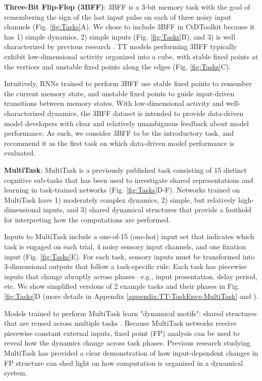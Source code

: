 \documentclass{article}
\begin{document}
\textbf{Three-Bit Flip-Flop (3BFF)}: 3BFF is a 3-bit memory task with the goal of remembering the sign of the last input pulse on each of three noisy input channels (Fig. \ref{fig:Tasks}A). We chose to include 3BFF in CtDToolkit because it has 1) simple dynamics, 2) simple inputs (Fig. \ref{fig:Tasks}B), and 3) is well characterized by previous research \cite{sussillo_opening_2013}. TT models performing 3BFF typically exhibit low-dimensional activity organized into a cube, with stable fixed points at the vertices and unstable fixed points along the edges (Fig. \ref{fig:Tasks}C).

Intuitively, RNNs trained to perform 3BFF use stable fixed points to remember the current memory state, and unstable fixed points to guide input-driven transitions between memory states. With low-dimensional activity and well-characterized dynamics, the 3BFF dataset is intended to provide data-driven model developers with clear and relatively unambiguous feedback about model performance. As such, we consider 3BFF to be the introductory task, and recommend it as the first task on which data-driven model performance is evaluated.

\textbf{MultiTask}: MultiTask is a previously published task \cite{yang_task_2019, driscoll_flexible_2022, dubreuil2022role} consisting of 15 distinct cognitive sub-tasks that has been used to investigate shared representations and learning in task-trained networks (Fig. \ref{fig:Tasks}D-F). Networks trained on MultiTask have 1) moderately complex dynamics, 2) simple, but relatively high-dimensional inputs, and 3) shared dynamical structures that provide a foothold for interpreting how the computations are performed.

Inputs to MultiTask include a one-of-15 (one-hot) input set that indicates which task is engaged on each trial, 4 noisy sensory input channels, and one fixation input (Fig. \ref{fig:Tasks}E). For each task, sensory inputs must be transformed into 3-dimensional outputs that follow a task-specific rule. Each task has piecewise inputs that change abruptly across phases– e.g., input presentation, delay period, etc. We show simplified versions of 2 example tasks and their phases in Fig. \ref{fig:Tasks}D (more details in Appendix \ref{appendix:TT-TaskEnvs-MultiTask} and \cite{yang_task_2019, driscoll_flexible_2022}).

Models trained to perform MultiTask learn "dynamical motifs": shared structures that are reused across multiple tasks \cite{ driscoll_flexible_2022}. Because MultiTask networks receive piecewise constant external inputs, fixed point (FP) analysis can be used to reveal how the dynamics change across task phases. Previous research studying MultiTask has provided a clear demonstration of how input-dependent changes in FP structure can shed light on how computation is organized in a dynamical system.
\end{document}

